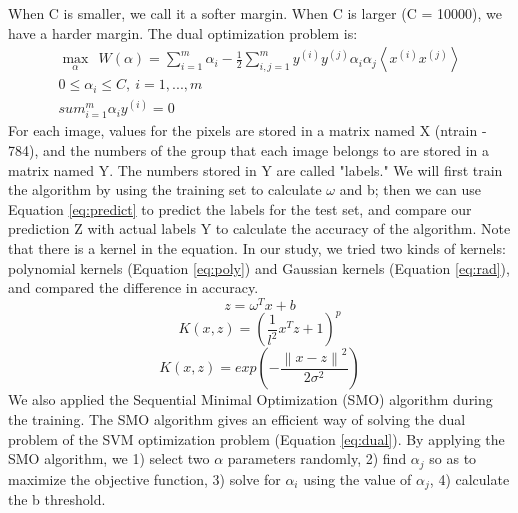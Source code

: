 \documentclass[UTF8,12pt]{article}
\begin{document}
	When C is smaller, we call it a softer margin. When C is larger (C = 10000), we have a harder margin.
	The dual optimization problem is:
	\begin{equation}
	\label{eq:dual}
	\begin{split}
	\max_{\alpha}\ \ W(\alpha )=\sum_{i=1}^{m}\alpha _{i}-\frac{1}{2}\sum_{i,j=1}^{m}y^{(i)}y^{(j)}\alpha _{i}\alpha _{j}\left \langle x^{(i)}x^{(j)} \right \rangle\\0\leq \alpha _{i}\leq C,\ i=1,...,m\\sum_{i=1}^{m}\alpha _{i}y^{(i)}=0
	\end{split}
	\end{equation}
	For each image, values for the pixels are stored in a matrix named X (ntrain - 784), and the numbers of the group that each image belongs to are stored in a matrix named Y. The numbers stored in Y are called "labels." We will first train the algorithm by using the training set to calculate $\omega$ and b; then we can use Equation \ref{eq:predict} to predict the labels for the test set, and compare our prediction Z with actual labels Y to calculate the accuracy of the algorithm. Note that there is a kernel in the equation. In our study, we tried two kinds of kernels: polynomial kernels (Equation \ref{eq:poly}) and Gaussian kernels (Equation \ref{eq:rad}), and compared the difference in accuracy. 
	\begin{equation}
	\label{eq:predict}
	z=\omega ^{T}x+b
	\end{equation}
	\begin{equation}
	\label{eq:poly}
	K(x,z)=(\frac{1}{l^{2}}x^{T}z+1)^{p}
	\end{equation}
	\begin{equation}
	\label{eq:rad}
	K(x,z)=exp\left ( -\frac{\left \| x-z \right \|^{2}}{2\sigma ^{2}} \right )
	\end{equation}
	We also applied the Sequential Minimal Optimization (SMO) algorithm during the training. The SMO algorithm gives an efficient way of solving the dual problem of the SVM optimization problem (Equation \ref{eq:dual}). By applying the SMO algorithm, we 1) select two $\alpha$ parameters randomly, 2) find $\alpha _{j}$ so as to maximize the objective function, 3) solve for $\alpha _{i}$ using the value of $\alpha _{j}$, 4) calculate the b threshold.
\end{document}
